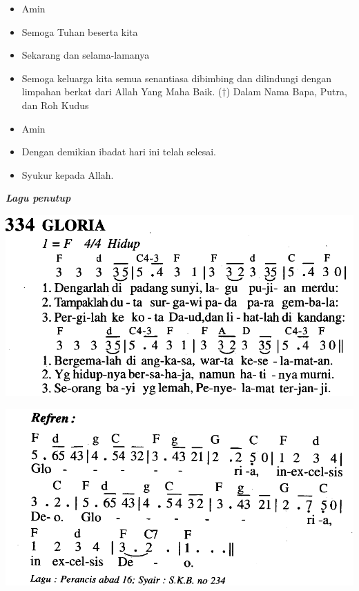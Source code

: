 \documentclass[a5paper,12pt,openany]{scrbook}
\makeatletter
\newcommand{\lagu}[1]{%
  {\parindent \z@ \normalfont
    \interlinepenalty\@M \bfseries \emph{#1}\par\nobreak \vskip 20\p@ }}
\newcommand{\BU}[1]{\begin{itemize} \item[U:] #1 \end{itemize}}
\newcommand{\BI}[1]{\begin{itemize} \item[P:] #1 \end{itemize}}
\makeatother
\begin{document}
\BU{Amin}

\BI{Semoga Tuhan beserta kita}
\BU{Sekarang dan selama-lamanya}
\BI{Semoga keluarga kita semua senantiasa dibimbing dan dilindungi dengan limpahan berkat dari Allah Yang Maha Baik. ($\dagger$) Dalam Nama Bapa, Putra, dan Roh Kudus}
\BU{Amin}
\BI{Dengan demikian ibadat hari ini telah selesai.}
\BU{Syukur kepada Allah.}

\lagu{Lagu penutup}

\includegraphics[scale=0.3]{mb334-gloria-a.png}

\includegraphics[scale=0.3]{mb334-gloria-b.png}
\end{document}
